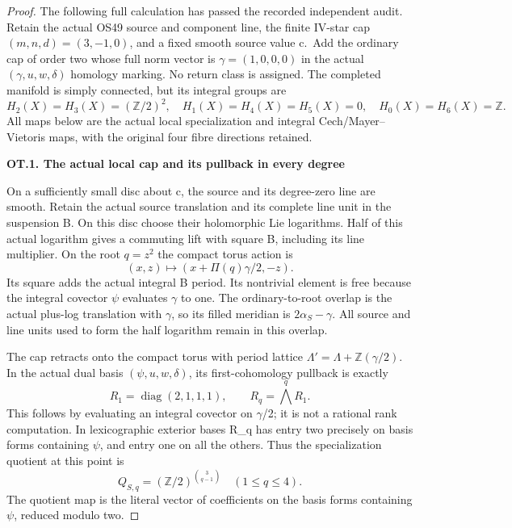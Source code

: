 \begin{proof}
The following full calculation has passed the recorded independent audit. Retain the actual OS49 source and
component line, the finite IV-star cap \((m,n,d)=(3,-1,0)\), and a fixed smooth
source value c.~Add the ordinary cap of order two whose full norm vector
is \(\gamma=(1,0,0,0)\) in the actual \((\gamma,u,w,\delta)\) homology marking. No
return class is assigned. The completed manifold is simply connected,
but its integral groups are
\[
 H_2(X)=H_3(X)=(\mathbb Z/2)^2,
 \quad H_1(X)=H_4(X)=H_5(X)=0,
 \quad H_0(X)=H_6(X)=\mathbb Z.                     \tag{OT.1}
\]
All maps below are the actual local specialization and integral
Cech/Mayer--Vietoris maps, with the original four fibre directions retained.

\par

\medskip\noindent\textbf{OT.1. The actual local cap and its pullback in every degree}

\par\nobreak

On a sufficiently small disc about c, the source and its degree-zero line
are smooth. Retain the actual source translation and its complete line
unit in the suspension B. On this disc choose their holomorphic Lie
logarithms. Half of this actual logarithm gives a commuting lift with
square B, including its line multiplier. On the root \(q=z^2\) the compact
torus action is
\[
                  (x,z)\longmapsto
                 (x+\Pi(q)\gamma/2,-z).                 \tag{OT.2}
\]
Its square adds the actual integral B period. Its nontrivial element is
free because the integral covector \(\psi\) evaluates \(\gamma\) to one. The
ordinary-to-root overlap is the actual plus-log translation with \(\gamma\),
so its filled meridian is \(2\alpha_S-\gamma\). All source and line units used
to form the half logarithm remain in this overlap.

The cap retracts onto the compact torus with period lattice
\(\Lambda'=\Lambda+\mathbb Z(\gamma/2)\). In the actual dual basis \((\psi,u,w,\delta)\), its
first-cohomology pullback is exactly
\[
                R_1=\operatorname{diag}(2,1,1,1),
                 \qquad R_q=\bigwedge^q R_1.              \tag{OT.3}
\]
This follows by evaluating an integral covector on \(\gamma\)/2; it is not a
rational rank computation. In lexicographic exterior bases R\_q has
entry two precisely on basis forms containing \(\psi\), and entry one on
all the others. Thus the specialization quotient at this point is
\[
           Q_{S,q}=(\mathbb Z/2)^{\binom3{q-1}}
                 \quad(1\le q\le4).                    \tag{OT.4}
\]
The quotient map is the literal vector of coefficients on the basis
forms containing \(\psi\), reduced modulo two.


\end{proof}
